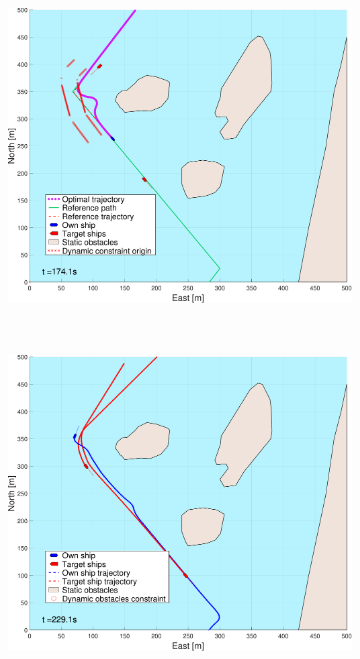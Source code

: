 \begin{figure}[!ht]
\begin{subfigure}[b]{0.494\textwidth}
        \subcaption{}
    \end{subfigure}
    \hfill
    \begin{subfigure}[b]{0.494\textwidth}
        \centering
        \includegraphics[width=\textwidth]{Images/NewFigures/Helloya/_Simple_0fig999_time=175}
        \subcaption{}
    \end{subfigure}
    \hfill
    \\ 
    \begin{subfigure}[b]{0.494\textwidth}
        \centering
        \includegraphics[width=\textwidth]{Images/NewFigures/Helloya/_Simple_0fig1_time=230}

\end{subfigure}
\end{figure}
